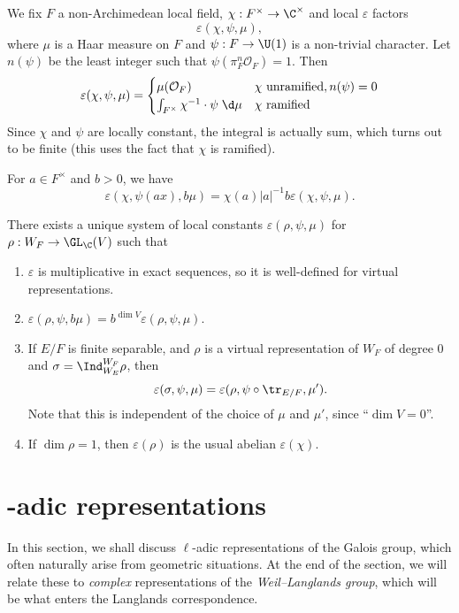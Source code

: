 \documentclass[a4paper]{article}
\begin{document}
We fix $F$ a non-Archimedean local field, $\chi: F^\times \to \C^\times$ and local $\varepsilon$ factors
\[
  \varepsilon(\chi, \psi, \mu),
\]
where $\mu$ is a Haar measure on $F$ and $\psi: F \to \U(1)$ is a non-trivial character. Let $n(\psi)$ be the least integer such that $\psi(\pi^n_F \mathcal{O}_F) = 1$. Then
\[
  \varepsilon(\chi, \psi, \mu) =
  \begin{cases}
    \mu(\mathcal{O}_F) & \chi\text{ unramified}, n(\psi) = 0\\
    \int_{F^\times} \chi^{-1} \cdot \psi \;\d \mu & \chi\text{ ramified}
  \end{cases}
\]
Since $\chi$ and $\psi$ are locally constant, the integral is actually sum, which turns out to be finite (this uses the fact that $\chi$ is ramified).

For $a \in F^\times$ and $b > 0$, we have
\[
  \varepsilon(\chi, \psi(ax), b \mu) = \chi(a) |a|^{-1} b \varepsilon(\chi, \psi, \mu).
\]
\begin{thm}
  There exists a unique system of local constants $\varepsilon(\rho, \psi, \mu)$ for $\rho: W_F \to \GL_\C(V)$ such that
  \begin{enumerate}
    \item $\varepsilon$ is multiplicative in exact sequences, so it is well-defined for virtual representations.
    \item $\varepsilon(\rho, \psi, b\mu) = b^{\dim V} \varepsilon(\rho, \psi, \mu)$.
    \item If $E/F$ is finite separable, and $\rho$ is a virtual representation of $W_F$ of degree $0$ and $\sigma = \Ind_{W_E}^{W_F} \rho$, then
      \[
        \varepsilon(\sigma, \psi, \mu) = \varepsilon(\rho, \psi \circ \tr_{E/F}, \mu').
      \]
      Note that this is independent of the choice of $\mu$ and $\mu'$, since ``$\dim V = 0$''.
    \item If $\dim \rho = 1$, then $\varepsilon(\rho)$ is the usual abelian $\varepsilon(\chi)$.
  \end{enumerate}
\end{thm}

\section{-adic representations}
In this section, we shall discuss $\ell$-adic representations of the Galois group, which often naturally arise from geometric situations. At the end of the section, we will relate these to \emph{complex} representations of the \emph{Weil--Langlands group}, which will be what enters the Langlands correspondence.
\end{document}
